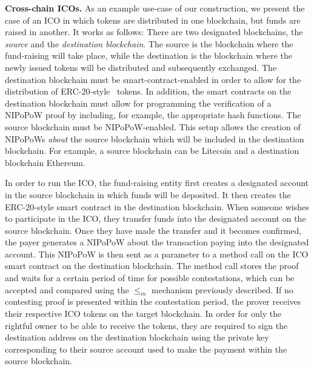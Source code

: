 \noindent
\textbf{Cross-chain ICOs.}
As an example use-case of our construction, we present the case of an
ICO in which tokens are distributed in one blockchain,
but funds are raised in another. It works as follows:
There are two designated blockchains, the \emph{source} and
the \emph{destination blockchain}. The source is the blockchain
where the fund-raising will take place, while the destination is the
blockchain where the newly issued tokens will be distributed and subsequently
exchanged. The destination blockchain must be smart-contract-enabled in order to
allow for the distribution of ERC-20-style~\cite{erc20} tokens.
In addition, the smart contracts on the destination blockchain must allow for
programming the verification of a NIPoPoW proof by including, for example, the
appropriate hash functions. The source blockchain must be NIPoPoW-enabled. This
setup allows the creation of NIPoPoWs \emph{about} the source blockchain which
will be included in the destination blockchain. For example, a source blockchain
can be Litecoin and a destination blockchain Ethereum.

In order to run the ICO, the fund-raising entity first creates a designated
account in the source blockchain in which funds will be deposited. It then
creates the ERC-20-style smart contract in the destination blockchain. When
someone wishes to participate in the ICO, they transfer funds into the
designated account on the source blockchain. Once they have made the transfer
and it becomes confirmed, the payer generates a NIPoPoW about the transaction
paying into the designated account. This NIPoPoW is then sent as a parameter to
a method call on the ICO smart contract on the destination blockchain. The
method call stores the proof and waits for a certain period of time for possible
contestations, which can be accepted and compared using the $\leq_m$ mechanism
previously described. If no contesting proof is presented within the
contestation period, the prover receives their respective ICO tokens on the
target blockchain. In order for only the rightful owner to be able to receive
the tokens, they are required to sign the destination address on the destination
blockchain using the private key corresponding to their source account used to
make the payment within the source blockchain.

